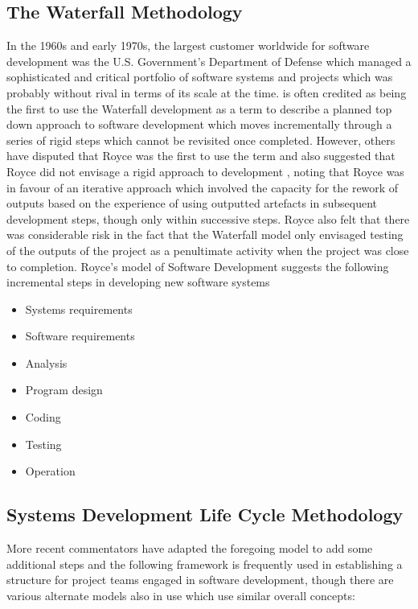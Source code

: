 \documentclass[a4paper,Times New Roman 11pt]{article}
\begin{document}
\begin{samepage}
\begin{samepage}
\subsection {The Waterfall Methodology}
In the 1960s and early 1970s, the largest customer worldwide for software development was the U.S. Government's Department of Defense which managed a sophisticated and critical portfolio of software systems and projects which was probably without rival in terms of its scale at the time.  \parencite{royce} is often credited as being the first to use the Waterfall development as a term to describe a planned top down approach to software development which moves incrementally through a series of rigid steps which cannot be revisited once completed. However, others have disputed that Royce was the first to use the term and also suggested that Royce did not envisage a rigid approach to development , noting that Royce was in favour of an iterative approach which involved the capacity for the rework of outputs based on the experience of using outputted artefacts in subsequent development steps, though only within successive steps. Royce also felt that there was considerable risk in the fact that the Waterfall model only envisaged testing of the outputs of the project as a penultimate activity when the project was close to completion.
Royce's model of Software Development suggests the following incremental steps in developing new software systems
\begin{itemize}
\item Systems requirements
\item Software requirements
\item Analysis
\item Program design
\item Coding
\item Testing
\item Operation
\end{itemize}
\newpage
\subsection {Systems Development Life Cycle Methodology}
More recent commentators have adapted the foregoing model to add some additional steps and the following framework is frequently used in establishing a structure for project teams engaged in software development, though there are various alternate models also in use which use  similar overall concepts:


\end{samepage}
\end{samepage}
\end{document}
